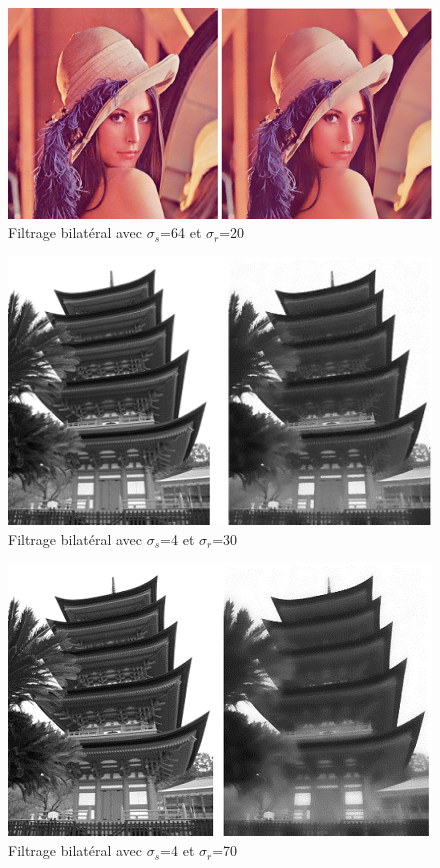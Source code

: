 \documentclass[twoside,UTF8]{EPURapport}
\begin{document}
\begin{figure}[H]
	\begin{center} 
		\includegraphics[scale=0.7]{images/lena_64_20.png} 
	\end{center} 
	\caption{Filtrage bilatéral avec $\sigma_s$=64 et $\sigma_r$=20 }
\end{figure} 

\begin{figure}[H]
	\begin{center} 
		\includegraphics[]{images/IM088_4_30.png} 
	\end{center} 
	\caption{Filtrage bilatéral avec $\sigma_s$=4 et $\sigma_r$=30 }
\end{figure} 

\begin{figure}[H]
	\begin{center} 
		\includegraphics[]{images/IM088_4_70.png} 
	\end{center} 
	\caption{Filtrage bilatéral avec $\sigma_s$=4 et $\sigma_r$=70 }
\end{figure} 
\end{document}
